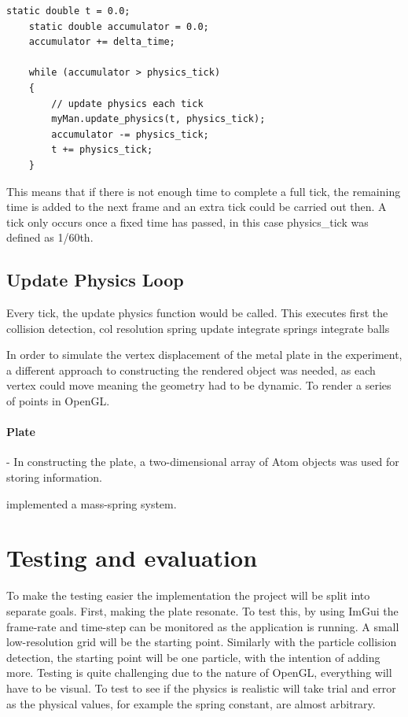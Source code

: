 \documentclass[conference,backref=page]{acmsiggraph}
\begin{document}
\begin{lstlisting}[caption = {update function called per frame}, label = {lst:tick}]
	static double t = 0.0;
	static double accumulator = 0.0;
	accumulator += delta_time;
	
	while (accumulator > physics_tick)
	{
		// update physics each tick
		myMan.update_physics(t, physics_tick);
		accumulator -= physics_tick;
		t += physics_tick;
	}
\end{lstlisting}

This means that if there is not enough time to complete a full tick, the remaining time is added to the next frame and an extra tick could be carried out then. A tick only occurs once a fixed time has passed, in this case physics\_tick was defined as 1/60th.

\subsection{Update Physics Loop}

Every tick, the update physics function would be called. This executes first the collision detection,
col resolution
spring update
integrate springs
integrate balls


In order to simulate the vertex displacement of the metal plate in the experiment, a different approach to constructing the rendered object was needed, as each vertex could move meaning the geometry had to be dynamic.
To render a series of points in OpenGL.


\paragraph{Plate} - In constructing the plate, a two-dimensional array of Atom objects was used for storing information.


 implemented a mass-spring system.

\section{Testing and evaluation}

To make the testing easier the implementation the project will be split into separate goals. First, making the plate resonate. To test this, by using ImGui the frame-rate and time-step can be monitored as the application is running. A small low-resolution grid will be the starting point. Similarly with the particle collision detection, the starting point will be one particle, with the intention of adding more. Testing is quite challenging due to the nature of OpenGL, everything will have to be visual. To test to see if the physics is realistic will take trial and error as the physical values, for example the spring constant, are almost arbitrary.
\end{document}
